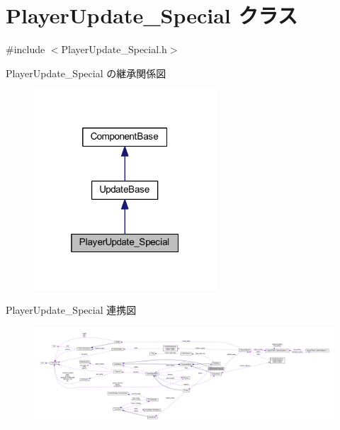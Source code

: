 \hypertarget{class_player_update___special}{}\section{Player\+Update\+\_\+\+Special クラス}
\label{class_player_update___special}


{\ttfamily \#include $<$Player\+Update\+\_\+\+Special.\+h$>$}



Player\+Update\+\_\+\+Special の継承関係図\nopagebreak
\begin{figure}[H]
\begin{center}
\leavevmode
\includegraphics[width=193pt]{class_player_update___special__inherit__graph}
\end{center}
\end{figure}


Player\+Update\+\_\+\+Special 連携図
\nopagebreak
\begin{figure}[H]
\begin{center}
\leavevmode
\includegraphics[width=350pt]{class_player_update___special__coll__graph}
\end{center}
\end{figure}
